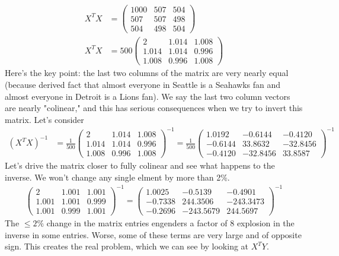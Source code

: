 \begin{align}
X^T X &=
\left(\begin{array}{ccc}
          1000 & 507 & 504 \\
           507 & 507 & 498 \\
           504 & 498 & 504
\end{array}\right)
\\
X^T X &=
500 
\left(\begin{array}{ccc}
           2     & 1.014 & 1.008 \\
           1.014 & 1.014 & 0.996 \\
           1.008 & 0.996 & 1.008
\end{array}\right)
\end{align}
Here's the key point: the last two columns of the matrix are very nearly equal
(because derived fact that almost everyone in Seattle is a Seahawks fan and
almost everyone in Detroit is a Lions fan).  We say the last two column vectors
are nearly "colinear," and this has serious consequences when we try to invert
this matrix.  Let's consider 
\begin{align}
(X^T X)^{-1} &=
\frac{1}{500}
\left(\begin{array}{ccc}
           2     & 1.014 & 1.008 \\
           1.014 & 1.014 & 0.996 \\
           1.008 & 0.996 & 1.008
\end{array}\right)^{-1}
=
\frac{1}{500}
\left(\begin{array}{ccc}
         1.0192  &  -0.6144 &  -0.4120 \\
        -0.614 4 &  33.8632 & -32.8456 \\
        -0.4120  & -32.8456 &  33.8587 
\end{array}\right)^{-1}
\end{align}
Let's drive the matrix closer to fully colinear and see what happens to the
inverse.  We won't change any single elment by more than 2\%.
\begin{align}
\left(\begin{array}{ccc}
           2     & 1.001 & 1.001 \\
           1.001 & 1.001 & 0.999 \\
           1.001 & 0.999 & 1.001
\end{array}\right)^{-1}
=
\left(\begin{array}{ccc}
          1.0025 &   -0.5139  &   -0.4901 \\
         -0.7338 &  244.3506  & -243.3473 \\
         -0.2696 & -243.5679  &  244.5697
\end{array}\right)^{-1}
\end{align}
The $\leq 2\%$ change in the matrix entries engenders a factor of 8 explosion in
the inverse in some entries. Worse, some of these terms are very large and of
opposite sign.  This creates the real problem, which we can see by looking at
$X^T Y$.

